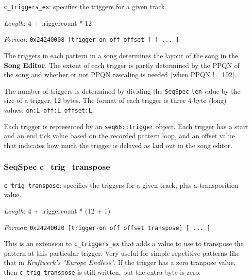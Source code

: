 
   \begin{description}
      \item \texttt{c\_triggers\_ex}: specifies the triggers for a given track.
      \item \textsl{Length}: 4 + triggercount * 12
      \item \textsl{Format}: \texttt{0x24240008 [trigger-on off offset ] [ ... ]}
   \end{description}

   The triggers in each pattern in a song determines the layout of the song in 
   the \textbf{Song Editor}.
   The extent of each trigger is partly determined by the PPQN of the song and
   whether or not PPQN rescaling is needed (when PPQN != 192).

   The number of triggers is determined by dividing the
   \texttt{SeqSpec} \texttt{len}
   value by the size of a trigger, 12 bytes.
   The format of each trigger is three 4-byte (long)
   values: \texttt{on:L off:L offset:L}.

   Each trigger is represented by an \texttt{seq66::trigger} object.
   Each trigger has a start and an end tick value based on the
   recorded pattern loop, and an offset value that indicates how much
   the trigger is delayed as laid out in the song editor.

\subsubsection{SeqSpec c\_trig\_transpose}
\label{subsubsec:midi_format_track_seqspec_trig_transpose}


   \begin{description}
      \item \texttt{c\_trig\_transpose}: specifies the triggers for a given
         track, plus a transposition value.
      \item \textsl{Length}: 4 + triggercount * (12 + 1)
      \item \textsl{Format}: \texttt{0x24240020 [trigger-on off offset transpose]
         [ ... ]}
   \end{description}

   This is an extension to \texttt{c\_triggers\_ex} that adds a value to use to
   transpose the pattern at this particular trigger.
   Very useful for simple repetitive patterns like that in
   \textsl{Kraftwerk's "Europe Endless"}.
   If the trigger has a zero tranpose value, then 
   \texttt{c\_trig\_transpose} is still written, but the extra byte is zero.

